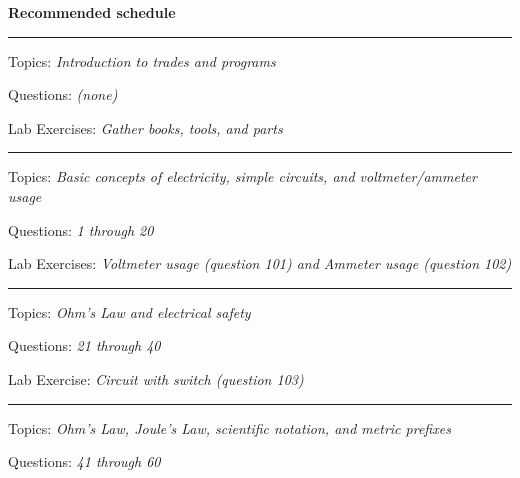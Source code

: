 \vskip 10pt

\noindent
{\bf Recommended schedule}

\vskip 5pt

\hrule \vskip 5pt
\noindent
{}

\hskip 10pt Topics: {\it Introduction to trades and programs}
 
\hskip 10pt Questions: {\it (none)}
 
\hskip 10pt Lab Exercises: {\it Gather books, tools, and parts}

\vskip 10pt
\hrule \vskip 5pt
\noindent
{}

\hskip 10pt Topics: {\it Basic concepts of electricity, simple circuits, and voltmeter/ammeter usage}
 
\hskip 10pt Questions: {\it 1 through 20}
 
\hskip 10pt Lab Exercises: {\it Voltmeter usage (question 101) and Ammeter usage (question 102)}
 



\vskip 10pt
\hrule \vskip 5pt
\noindent
{}

\hskip 10pt Topics: {\it Ohm's Law and electrical safety}
 
\hskip 10pt Questions: {\it 21 through 40}
 
\hskip 10pt Lab Exercise: {\it Circuit with switch (question 103)}
 



\vskip 10pt
\hrule \vskip 5pt
\noindent
{}

\hskip 10pt Topics: {\it Ohm's Law, Joule's Law, scientific notation, and metric prefixes}
 
\hskip 10pt Questions: {\it 41 through 60}
 
